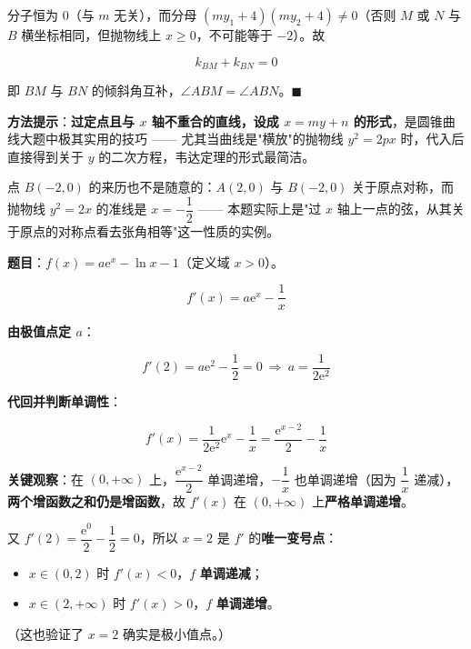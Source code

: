 分子恒为 $0$（与 $m$ 无关），而分母 $\left(my_1+4\right)\left(my_2+4\right)\ne0$（否则 $M$ 或 $N$ 与 $B$ 横坐标相同，但抛物线上 $x\ge0$，不可能等于 $-2$）。故

\[k_{BM}+k_{BN}=0\]

即 $BM$ 与 $BN$ 的倾斜角互补，$\angle ABM=\angle ABN$。$\blacksquare$

\begin{gktip}
\textbf{方法提示}：\textbf{过定点且与 $x$ 轴不重合的直线，设成 $x=my+n$ 的形式}，是圆锥曲线大题中极其实用的技巧 —— 尤其当曲线是"横放"的抛物线 $y^{2}=2px$ 时，代入后直接得到关于 $y$ 的二次方程，韦达定理的形式最简洁。

点 $B(-2,0)$ 的来历也不是随意的：$A(2,0)$ 与 $B(-2,0)$ 关于原点对称，而抛物线 $y^{2}=2x$ 的准线是 $x=-\dfrac12$ —— 本题实际上是"过 $x$ 轴上一点的弦，从其关于原点的对称点看去张角相等"这一性质的实例。
\end{gktip}

\par\medskip


\textbf{题目}：$f(x)=a\mathrm e^{x}-\ln x-1$（定义域 $x>0$）。


\[f'(x)=a\mathrm e^{x}-\frac1x\]

\textbf{由极值点定 $a$}：

\[f'(2)=a\mathrm e^{2}-\frac12=0\ \Longrightarrow\ a=\frac1{2\mathrm e^{2}}\]

\textbf{代回并判断单调性}：

\[f'(x)=\frac1{2\mathrm e^{2}}\mathrm e^{x}-\frac1x=\frac{\mathrm e^{x-2}}2-\frac1x\]

\textbf{关键观察}：在 $(0,+\infty)$ 上，$\dfrac{\mathrm e^{x-2}}2$ 单调递增，$-\dfrac1x$ 也单调递增（因为 $\dfrac1x$ 递减），\textbf{两个增函数之和仍是增函数}，故 $f'(x)$ 在 $(0,+\infty)$ 上\textbf{严格单调递增}。

又 $f'(2)=\dfrac{\mathrm e^{0}}2-\dfrac12=0$，所以 $x=2$ 是 $f'$ 的\textbf{唯一变号点}：

\begin{itemize}
\item $x\in(0,2)$ 时 $f'(x)<0$，$f$ \textbf{单调递减}；
\item $x\in(2,+\infty)$ 时 $f'(x)>0$，$f$ \textbf{单调递增}。
\end{itemize}

（这也验证了 $x=2$ 确实是极小值点。）

